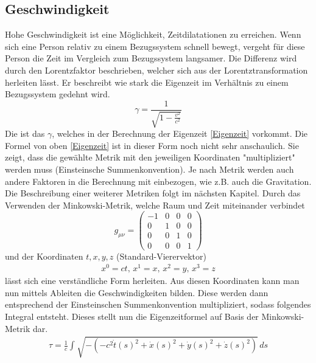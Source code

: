 \begin{refsection}
\subsection{Geschwindigkeit}
Hohe Geschwindigkeit ist eine Möglichkeit, Zeitdilatationen zu erreichen. Wenn sich eine Person relativ zu einem Bezugssystem schnell bewegt, vergeht f\"ur diese Person die Zeit im Vergleich zum Bezugssystem langsamer. Die Differenz wird durch den Lorentzfaktor beschrieben, welcher sich aus der Lorentztransformation herleiten l\"asst. Er beschreibt wie stark die Eigenzeit im Verhältnis zu einem Bezugssystem gedehnt wird. 
\begin{equation} \label{lorentzfaktor}
    \gamma=\frac{1}{\sqrt{1-\displaystyle\frac{v^2}{c^2}}} 
\end{equation}
Die ist das $\gamma$, welches in der Berechnung der Eigenzeit \eqref{Eigenzeit} vorkommt. %
Die Formel von oben \eqref{Eigenzeit} ist in dieser Form noch nicht sehr anschaulich. Sie zeigt, dass die gewählte Metrik mit den jeweiligen Koordinaten "multipliziert" werden muss (Einsteinsche Summenkonvention). Je nach Metrik werden auch andere Faktoren in die Berechnung mit einbezogen, wie z.B. auch die Gravitation. Die Beschreibung einer weiterer Metriken folgt im nächsten Kapitel.
Durch das Verwenden der Minkowski-Metrik, welche Raum und Zeit miteinander verbindet 
\begin{equation}
    g_{\mu\nu}=
    \begin{pmatrix}
        -1 & 0 & 0 & 0 \\
        0 & 1 & 0 & 0 \\
        0 & 0 & 1 & 0 \\
        0 & 0 & 0 & 1
    \end{pmatrix}
\end{equation}
und der Koordinaten $t, x, y, z$  (Standard-Vierervektor)
\begin{align*}
x^{0}=ct,\, x^{1}=x,\, x^{2}=y,\, x^{3}=z 
\end{align*}
l\"asst sich eine verst\"andliche Form herleiten.
Aus diesen Koordinaten kann man nun mittels Ableiten die Geschwindigkeiten bilden. Diese werden dann entsprechend der Einsteinschen Summenkonvention multipliziert, sodass folgendes Integral entsteht. Dieses stellt nun die Eigenzeitformel auf Basis der Minkowski-Metrik dar.
\begin{align*}
    \tau
    =
    \frac{1}{c}\int_{}^{}\sqrt{-(-c^2\dot{t}(s)^{2}+\dot{x}(s)^{2}+\dot{y}(s)^{2}+\dot{z}(s)^{2})}\,ds
\end{align*} 

\end{refsection}
